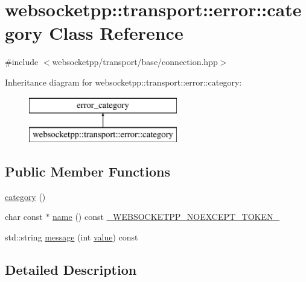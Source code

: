 \hypertarget{classwebsocketpp_1_1transport_1_1error_1_1category}{}\section{websocketpp\+:\+:transport\+:\+:error\+:\+:category Class Reference}
\label{classwebsocketpp_1_1transport_1_1error_1_1category}


{\ttfamily \#include $<$websocketpp/transport/base/connection.\+hpp$>$}

Inheritance diagram for websocketpp\+:\+:transport\+:\+:error\+:\+:category\+:\begin{figure}[H]
\begin{center}
\leavevmode
\includegraphics[height=2.000000cm]{classwebsocketpp_1_1transport_1_1error_1_1category}
\end{center}
\end{figure}
\subsection*{Public Member Functions}
\begin{DoxyCompactItemize}
\item 
\hyperlink{classwebsocketpp_1_1transport_1_1error_1_1category_ac06b7e9707ab65a6560be0e15d9f44da}{category} ()
\item 
char const $\ast$ \hyperlink{classwebsocketpp_1_1transport_1_1error_1_1category_a326b11bd1d14a180089f0562e18c3426}{name} () const \hyperlink{boost__config_8hpp_aa19747404a5f2fe9c9eb9e9d2e48f26c}{\+\_\+\+W\+E\+B\+S\+O\+C\+K\+E\+T\+P\+P\+\_\+\+N\+O\+E\+X\+C\+E\+P\+T\+\_\+\+T\+O\+K\+E\+N\+\_\+}
\item 
std\+::string \hyperlink{classwebsocketpp_1_1transport_1_1error_1_1category_a05329f3cabde2a66991329ac27c0099a}{message} (int \hyperlink{namespacewebsocketpp_1_1transport_1_1error_a8d371a2562d813e5a2e106e2694d4fb0}{value}) const 
\end{DoxyCompactItemize}


\subsection{Detailed Description}


